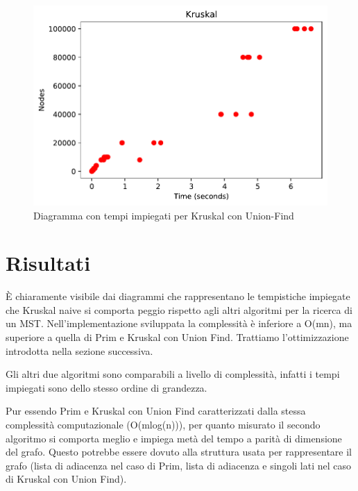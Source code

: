 \begin{figure}[htp]
    \centering
    \includegraphics[width=\textwidth]{immagini/kruskal.pdf}
    \caption{Diagramma con tempi impiegati per Kruskal con Union-Find}
    \label{fig:diagramma-kruskal}
\end{figure}

\clearpage

\section{Risultati\label{sec:risultati}}
È chiaramente visibile dai diagrammi che rappresentano le tempistiche impiegate che Kruskal naive si comporta peggio rispetto agli altri algoritmi per la ricerca di un MST.
Nell'implementazione sviluppata la complessità è inferiore a O(mn), ma superiore a quella di Prim e Kruskal con Union Find.
Trattiamo l'ottimizzazione introdotta nella sezione successiva.

Gli altri due algoritmi sono comparabili a livello di complessità, infatti i tempi impiegati sono dello stesso ordine di grandezza.

Pur essendo Prim e Kruskal con Union Find caratterizzati dalla stessa complessità computazionale (O(mlog(n))), per quanto misurato il secondo algoritmo si comporta meglio e impiega metà del tempo a parità di dimensione del grafo.
Questo potrebbe essere dovuto alla struttura usata per rappresentare il grafo (lista di adiacenza nel caso di Prim, lista di adiacenza e singoli lati nel caso di Kruskal con Union Find).